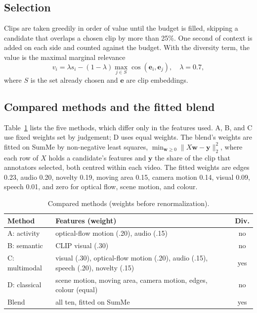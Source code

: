 \documentclass[conference]{IEEEtran}
\begin{document}
\subsection{Selection}
Clips are taken greedily in order of value until the budget is filled, skipping a candidate that overlaps a chosen clip by more than 25\%. One second of context is added on each side and counted against the budget. With the diversity term, the value is the maximal marginal relevance \cite{carbonell1998mmr}
\begin{equation}
v_i = \lambda s_i - (1 - \lambda) \max_{j \in S} \cos(\mathbf{e}_i, \mathbf{e}_j), \quad \lambda = 0.7 ,
\end{equation}
where $S$ is the set already chosen and $\mathbf{e}$ are clip embeddings.

\subsection{Compared methods and the fitted blend}
Table~\ref{tab:methods} lists the five methods, which differ only in the features used. A, B, and C use fixed weights set by judgement; D uses equal weights. The blend's weights are fitted on SumMe by non-negative least squares, $\min_{\mathbf{w} \ge 0} \lVert X\mathbf{w} - \mathbf{y} \rVert_2^2$, where each row of $X$ holds a candidate's features and $\mathbf{y}$ the share of the clip that annotators selected, both centred within each video. The fitted weights are edges 0.23, audio 0.20, novelty 0.19, moving area 0.15, camera motion 0.14, visual 0.09, speech 0.01, and zero for optical flow, scene motion, and colour.
\begin{table}[t]
\caption{Compared methods (weights before renormalization).}
\label{tab:methods}
\centering
\begin{tabular}{@{}l>{\raggedright\arraybackslash}p{4.6cm}c@{}}
\toprule
Method & Features (weight) & Div. \\
\midrule
A: activity & optical-flow motion (.20), audio (.15) & no \\
B: semantic & CLIP visual (.30) & no \\
C: multimodal & visual (.30), optical-flow motion (.20), audio (.15), speech (.20), novelty (.15) & yes \\
D: classical & scene motion, moving area, camera motion, edges, colour (equal) & no \\
Blend & all ten, fitted on SumMe & yes \\
\bottomrule
\end{tabular}
\end{table}
\end{document}
